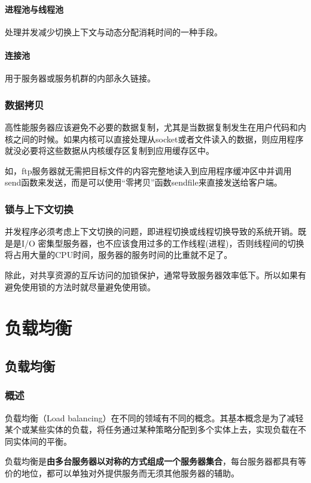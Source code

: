 \documentclass[UTF8,a4paper,8pt]{ctexbook}
\begin{document}
			\subsubsection{进程池与线程池}
				处理并发减少切换上下文与动态分配消耗时间的一种手段。
				
			\subsubsection{连接池}
				用于服务器或服务机群的内部永久链接。
				
		\subsection{数据拷贝}
			高性能服务器应该避免不必要的数据复制，尤其是当数据复制发生在用户代码和内核之间的时候。如果内核可以直接处理从socket或者文件读入的数据，则应用程序就没必要将这些数据从内核缓存区复制到应用缓存区中。
			
			如，ftp服务器就无需把目标文件的内容完整地读入到应用程序缓冲区中并调用send函数来发送，而是可以使用“零拷贝”函数sendfile来直接发送给客户端。
			
		\subsection{锁与上下文切换}
			并发程序必须考虑上下文切换的问题，即进程切换或线程切换导致的系统开销。既是是I/O 密集型服务器，也不应该食用过多的工作线程(进程)，否则线程间的切换将占用大量的CPU时间，服务器的服务时间的比重就不足了。
			
			除此，对共享资源的互斥访问的加锁保护，通常导致服务器效率低下。所以如果有避免使用锁的方法时就尽量避免使用锁。
		
		
\chapter{负载均衡}
	\section{负载均衡}
		\subsection{概述}
			负载均衡（Load balancing）在不同的领域有不同的概念。其基本概念是为了减轻某个或某些实体的负载，将任务通过某种策略分配到多个实体上去，实现负载在不同实体间的平衡。
			
			负载均衡是\textbf{由多台服务器以对称的方式组成一个服务器集合}，每台服务器都具有等价的地位，都可以单独对外提供服务而无须其他服务器的辅助。
			
\end{document}
